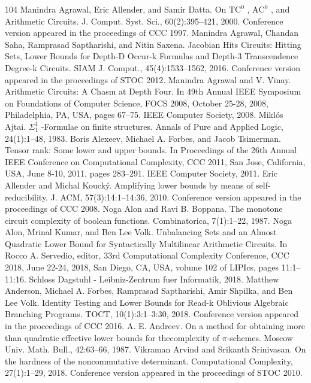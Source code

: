 \documentclass[10pt,a4paper]{article}
\begin{document}
\begin{thebibliography}{104}
 Manindra Agrawal, Eric Allender, and Samir Datta. On $\mathrm{TC}^0$ , $\mathrm{AC}^0$ , and Arithmetic Circuits. J. Comput. Syst. Sci., 60(2):395–421, 2000. Conference version appeared in the proceedings of CCC 1997.
 Manindra Agrawal, Chandan Saha, Ramprasad Saptharishi, and Nitin Saxena. Jacobian Hits Circuits: Hitting Sets, Lower Bounds for Depth-D Occur-k Formulas and Depth-3 Transcendence Degree-k Circuits. SIAM J. Comput., 45(4):1533–1562, 2016. Conference version appeared in the proceedings of STOC 2012.
 Manindra Agrawal and V. Vinay. Arithmetic Circuits: A Chasm at Depth Four. In 49th Annual IEEE Symposium on Foundations of Computer Science, FOCS 2008, October 25-28, 2008, Philadelphia, PA, USA, pages 67–75. IEEE Computer Society, 2008.
 Miklós Ajtai. $\Sigma^1_1$ -Formulae on finite structures. Annals of Pure and Applied Logic, 24(1):1–48, 1983.
 Boris Alexeev, Michael A. Forbes, and Jacob Tsimerman. Tensor rank: Some lower and upper bounds. In Proceedings of the 26th Annual IEEE Conference on Computational Complexity, CCC 2011, San Jose, California, USA, June 8-10, 2011, pages 283–291. IEEE Computer Society, 2011.
 Eric Allender and Michal Koucký. Amplifying lower bounds by means of self-reducibility. J. ACM, 57(3):14:1–14:36, 2010. Conference version appeared in the proceedings of CCC 2008.
 Noga Alon and Ravi B. Boppana. The monotone circuit complexity of boolean functions. Combinatorica, 7(1):1–22, 1987.
 Noga Alon, Mrinal Kumar, and Ben Lee Volk. Unbalancing Sets and an Almost Quadratic Lower Bound for Syntactically Multilinear Arithmetic Circuits. In Rocco A. Servedio, editor, 33rd Computational Complexity Conference, CCC 2018, June 22-24, 2018, San Diego, CA, USA, volume 102 of LIPIcs, pages 11:1–11:16. Schloss Dagstuhl - Leibniz-Zentrum fuer Informatik, 2018.
 Matthew Anderson, Michael A. Forbes, Ramprasad Saptharishi, Amir Shpilka, and Ben Lee Volk. Identity Testing and Lower Bounds for Read-k Oblivious Algebraic Branching Programs. TOCT, 10(1):3:1–3:30, 2018. Conference version appeared in the proceedings of CCC 2016.
 A. E. Andreev. On a method for obtaining more than quadratic effective lower bounds for thecomplexity of $\pi$-schemes. Moscow Univ. Math. Bull., 42:63–66, 1987.
 Vikraman Arvind and Srikanth Srinivasan. On the hardness of the noncommutative determinant. Computational Complexity, 27(1):1–29, 2018. Conference version appeared in the proceedings of STOC 2010.

\end{thebibliography}
\end{document}
